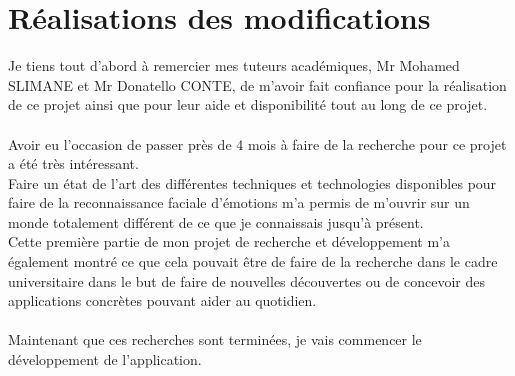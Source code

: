 \documentclass[poster]{polytech/polytech}
\begin{document}
\chapter{Réalisations des modifications}


Je tiens tout d'abord à remercier mes tuteurs académiques, Mr Mohamed SLIMANE et Mr Donatello CONTE, de m'avoir fait confiance pour la réalisation de ce projet ainsi que pour leur aide et disponibilité tout au long de ce projet.\\
\\
Avoir eu l'occasion de passer près de 4 mois à faire de la recherche pour ce projet a été très intéressant.\\
Faire un état de l'art des différentes techniques et technologies disponibles pour faire de la reconnaissance faciale d'émotions m'a permis de m'ouvrir sur un monde totalement différent de ce que je connaissais jusqu'à présent.\\
Cette première partie de mon projet de recherche et développement m'a également montré ce que cela pouvait être de faire de la recherche dans le cadre universitaire dans le but de faire de nouvelles découvertes ou de concevoir des applications concrètes pouvant aider au quotidien.\\
\\
Maintenant que ces recherches sont terminées, je vais commencer le développement de l'application.

\appendix
\end{document}
